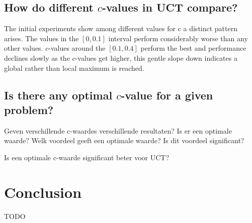 \documentclass[11pt,a4paper]{article}
\begin{document}
\subsection{How do different $c$-values in UCT compare?}
The initial experiments show among different values for c a distinct pattern arises. The values in the $[0,0.1]$ interval perform considerably worse than any other values. $c$-values around the $[0.1,0.4]$ perform the best and performance declines slowly as the $c$-values get higher, this gentle slope down indicates a global rather than local maximum is reached.
\subsection{Is there any optimal $c$-value for a given problem?}

Geven verschillende c-waardes verschillende resultaten?
Is er een optimale waarde?
Welk voordeel geeft een optimale waarde?
Is dit voordeel significant?

Is een optimale c-waarde significant beter voor UCT?

\section{Conclusion}
TODO

\vfill
\pagebreak
\printbibliography

\vfill
\pagebreak
\end{document}
